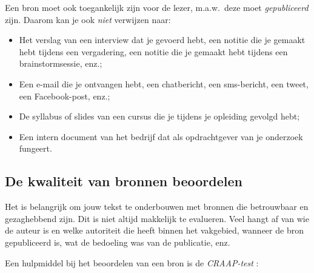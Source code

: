 Een bron moet ook toegankelijk zijn voor de lezer, m.a.w.\ deze moet \textit{gepubliceerd} zijn. Daarom kan je ook \textit{niet} verwijzen naar:

\begin{itemize}
  \item Het verslag van een interview dat je gevoerd hebt, een notitie die je gemaakt hebt tijdens een vergadering, een notitie die je gemaakt hebt tijdens een brainstormsessie, enz.;
  \item Een e-mail die je ontvangen hebt, een chatbericht, een sms-bericht, een tweet, een Facebook-post, enz.;
  \item De syllabus of slides van een cursus die je tijdens je opleiding gevolgd hebt;
  \item Een intern document van het bedrijf dat als opdrachtgever van je onderzoek fungeert.
\end{itemize}

\subsection{De kwaliteit van bronnen beoordelen}%
\label{sub:de-kwaliteit-van-bronnen-beoordelen}

Het is belangrijk om jouw tekst te onderbouwen met bronnen die betrouwbaar en gezaghebbend zijn. Dit is niet altijd makkelijk te evalueren. Veel hangt af van wie de auteur is en welke autoriteit die heeft binnen het vakgebied, wanneer de bron gepubliceerd is, wat de bedoeling was van de publicatie, enz.

Een hulpmiddel bij het beoordelen van een bron is de \emph{CRAAP-test} \autocite{Blakeslee2004}:

